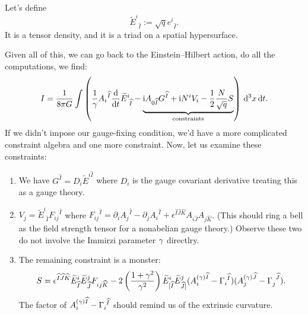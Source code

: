 \begin{notation}
  Let's define
  \begin{equation}
{\widetilde{E}^{i}}_{\widehat{I}} := \sqrt{q}{e^{i}}_{\widehat{I}}.
  \end{equation}
It is a tensor density, and it is a triad on a spatial hypersurface.
\end{notation}

Given all of this, we can go back to the Einstein--Hilbert action, do
all the computations, we find:
\begin{equation}
  I = \frac{1}{8\pi G}\int\left(
  \frac{1}{\gamma}{A_{i}}^{\widehat{I}}\frac{\mathrm{d}}{\mathrm{d} t} {{\widetilde{E}}^{i}}_{\phantom{i}\widehat{I}}
-\underbrace{\mathrm{i} A_{0\widehat{I}}G^{\widehat{I}} + \mathrm{i}N^{i}V_{i} - \frac{1}{2}\frac{N}{\sqrt{q}}S}_{\text{constraints}}
  \right)\,\mathrm{d}^{3}x\,\mathrm{d} t.
\end{equation}
If we didn't impose our gauge-fixing condition, we'd have a more
complicated constraint algebra and one more constraint. Now, let us
examine these constraints:
\begin{enumerate}
\item We have $G^{\widehat{I}} = D_{i}\widetilde{E}^{i\widehat{I}}$
  where $D_{i}$ is the gauge covariant derivative treating this as a
  gauge theory.
\item $V_{j} = \widetilde{E}^{i}_{\phantom{i}\widehat{I}}{F_{ij}}^{\widehat{I}}$
  where ${F_{ij}}^{\widehat{I}} = \partial_{i}{A_{j}}^{\widehat{I}} - \partial_{j}{A_{i}}^{\widehat{I}}+\epsilon^{\widehat{I}\widehat{J}\widehat{K}}A_{i\widehat{J}}A_{j\widehat{K}}$.
  (This should ring a bell as the field strength tensor for a nonabelian
  gauge theory.) Observe these two do not involve the Immirzi parameter
  $\gamma$ directlry.
\item The remaining constraint is a monster:
  \begin{equation}
S = \epsilon^{\widehat{I}\widehat{J}\widehat{K}}\widetilde{E}^{i}_{\widehat{I}}\widetilde{E}^{j}_{\widehat{J}}F_{ij\widehat{K}}
-2\left(\frac{1+\gamma^{2}}{\gamma^{2}}\right)\widetilde{E}^{i}_{[\widehat{I}}\widetilde{E}^{j}_{\widehat{J}]}(A^{(\gamma)\widehat{I}}_{i}-\Gamma_{i}^{\phantom{i}\widehat{I}})
(A^{(\gamma)\widehat{J}}_{j}-\Gamma_{j}^{\phantom{j}\widehat{J}}).
  \end{equation}
  The factor of $A^{(\gamma)\widehat{I}}_{i}-\Gamma_{i}^{\phantom{i}\widehat{I}}$
  should remind us of the extrinsic curvature.
\end{enumerate}

